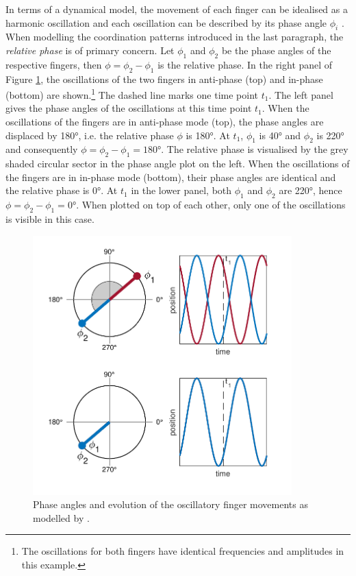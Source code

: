 In terms of a dynamical model, the movement of each finger can be idealised as a harmonic oscillation and each oscillation can be described by its phase angle $\phi_i$ \citep{HakenKelsoBunz1985}. When modelling the coordination patterns introduced in the last paragraph, the \emph{relative phase} is of primary concern. Let $\phi_1$ and $\phi_2$ be the phase angles of the respective fingers, then $\phi = \phi_2 - \phi_1$ is the relative phase. In the right panel of Figure \ref{fig:hkb_phase_position}, the oscillations of the two fingers in anti-phase (top) and in-phase (bottom) are shown.\footnote{The oscillations for both fingers have identical frequencies and amplitudes in this example.} The dashed line marks one time point $t_1$. The left panel gives the phase angles of the oscillations at this time point $t_1$. When the oscillations of the fingers are in anti-phase mode (top), the phase angles are displaced by 180°, i.e. the relative phase $\phi$ is 180°. At $t_1$, $\phi_1$ is 40° and $\phi_2$ is 220° and consequently $\phi=\phi_2-\phi_1=180$°. The relative phase is visualised by the grey shaded circular sector in the phase angle plot on the left. When the oscillations of the fingers are in in-phase mode (bottom), their phase angles are identical and the relative phase is 0°. At $t_1$ in the lower panel, both $\phi_1$ and $\phi_2$ are 220°, hence $\phi = \phi_2 - \phi_1 = 0$°. When plotted on top of each other, only one of the oscillations is visible in this case. 

\begin{figure}[!htbp]
\begin{center}
\includegraphics[width=10cm]{figures/ch3/phase_position_hkb_fingers.pdf}
\caption{Phase angles and evolution of the oscillatory finger movements as modelled by \citet{HakenKelsoBunz1985}.}
\label{fig:hkb_phase_position}
\end{center}
\end{figure}

